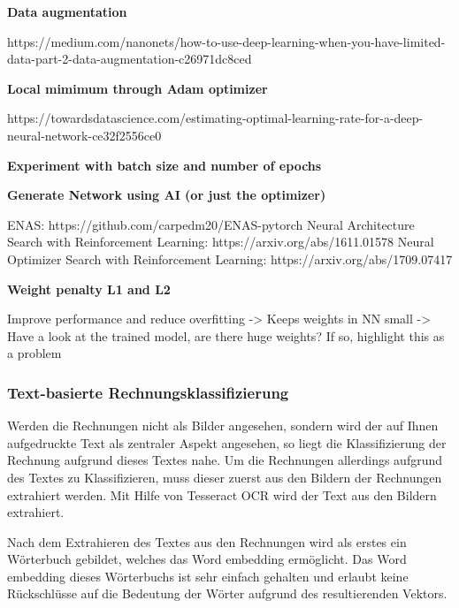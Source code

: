 \textbf{Data augmentation}

https://medium.com/nanonets/how-to-use-deep-learning-when-you-have-limited-data-part-2-data-augmentation-c26971dc8ced


\textbf{Local mimimum through Adam optimizer}

https://towardsdatascience.com/estimating-optimal-learning-rate-for-a-deep-neural-network-ce32f2556ce0


\textbf{Experiment with batch size and number of epochs}

\textbf{Generate Network using AI (or just the optimizer)}

ENAS: https://github.com/carpedm20/ENAS-pytorch
Neural Architecture Search with Reinforcement Learning: https://arxiv.org/abs/1611.01578
Neural Optimizer Search with Reinforcement Learning: https://arxiv.org/abs/1709.07417

\textbf{Weight penalty L1 and L2}

Improve performance and reduce overfitting -> Keeps weights in NN small
-> Have a look at the trained model, are there huge weights? If so, highlight this as a problem




\subsubsection{Text-basierte Rechnungsklassifizierung}
\label{chap:text-based-classification}


Werden die Rechnungen nicht als Bilder angesehen, sondern wird der auf Ihnen aufgedruckte Text als zentraler Aspekt angesehen, so liegt die Klassifizierung der Rechnung aufgrund dieses Textes nahe. Um die Rechnungen allerdings aufgrund des Textes zu Klassifizieren, muss dieser zuerst aus den Bildern der Rechnungen extrahiert werden. Mit Hilfe von Tesseract OCR wird der Text aus den Bildern extrahiert.

Nach dem Extrahieren des Textes aus den Rechnungen wird als erstes ein Wörterbuch gebildet, welches das Word embedding ermöglicht. Das Word embedding dieses Wörterbuchs ist sehr einfach gehalten und erlaubt keine Rückschlüsse auf die Bedeutung der Wörter aufgrund des resultierenden Vektors.

